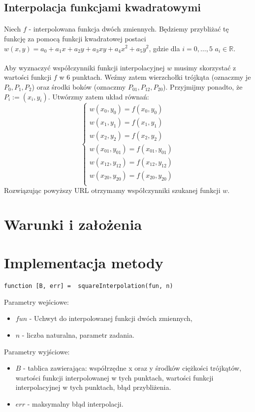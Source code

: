 \documentclass{article}
\begin{document}
\subsection{Interpolacja funkcjami kwadratowymi}
\paragraph{}
Niech $f$ - interpolowana funkcja dwóch zmiennych. Będziemy przybliżać tę funkcję za pomocą funkcji kwadratowej postaci $w(x,y) = a_0 + a_1x + a_2y + a_3xy + a_4x^2 + a_5y^2$, gdzie dla $i=0,\dots,5$  $a_i \in \mathbb{R}$.
\paragraph{}
Aby wyznaczyć współczynniki funkcji interpolacyjnej $w$ musimy skorzystać z wartości funkcji $f$ w 6 punktach. Weźmy zatem wierzchołki trójkąta (oznaczmy je $P_0, P_1, P_2$) oraz środki boków (oznaczmy $P_{01}, P_{12}, P_{20}$). Przyjmijmy ponadto, że $P_i := (x_i, y_i)$. Utwórzmy zatem układ równań:
$$
\left\{ 
\begin{array}{c}
w(x_0,y_0) = f(x_0, y_0) \\ 
w(x_1,y_1) = f(x_1, y_1) \\ 
w(x_2,y_2) = f(x_2, y_2) \\ 
w(x_{01},y_{01}) = f(x_{01}, y_{01}) \\
w(x_{12},y_{12}) = f(x_{12}, y_{12}) \\
w(x_{20},y_{20}) = f(x_{20}, y_{20}) \\ 
\end{array}
\right.
$$
Rozwiązując powyższy URL otrzymamy współczynniki szukanej funkcji $w$.
\section{Warunki i założenia}
\section{Implementacja metody}
\paragraph{}
\begin{lstlisting}[style=Matlab-editor]
function [B, err] =  squareInterpolation(fun, n)
\end{lstlisting}
\vspace{4pt}
Parametry wejściowe:
\begin{itemize}
\item $fun$ - Uchwyt do interpolowanej funkcji dwóch zmiennych,
\item $n$ - liczba naturalna, parametr zadania.
\end{itemize}
Parametry wyjściowe:
\begin{itemize}
\item $B$ - tablica zawierająca: współrzędne x oraz y środków ciężkości trójkątów, wartości funkcji interpolowanej w tych punktach, wartości funkcji interpolacyjnej w tych punktach, błąd przybliżenia.
\item $err$ - maksymalny błąd interpolacji.
\end{itemize}
\end{document}
